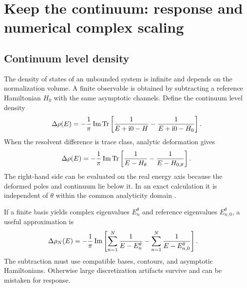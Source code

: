 \section{Keep the continuum: response and numerical complex scaling}
\label{sec:continuum-response}

\subsection{Continuum level density}
\label{subsec:cld}

The density of states of an unbounded system is infinite and depends on the
normalization volume.  A finite observable is obtained by subtracting a
reference Hamiltonian $H_0$ with the same asymptotic channels.  Define the
continuum level density
\begin{equation}
  \Delta\rho(E)
  =-\frac{1}{\pi}\operatorname{Im}\operatorname{Tr}\left[
  \frac{1}{E+\mathrm{i}0-H}
  -\frac{1}{E+\mathrm{i}0-H_0}
  \right] .
  \label{eq:cld-physical}
\end{equation}
When the resolvent difference is trace class, analytic deformation gives
\begin{equation}
  \Delta\rho(E)
  =-\frac{1}{\pi}\operatorname{Im}\operatorname{Tr}\left[
  \frac{1}{E-H_\theta}
  -\frac{1}{E-H_{0,\theta}}
  \right] .
  \label{eq:cld-csm}
\end{equation}
The right-hand side can be evaluated on the real energy axis because the
deformed poles and continuum lie below it.  In an exact calculation it is
independent of $\theta$ within the common analyticity domain
\cite{Myo:2014ypa,Morikawa:2025vvs,Ogawa:2026dSCSM}.

If a finite basis yields complex eigenvalues $E_n^{\theta}$ and reference
eigenvalues $E_{n,0}^{\theta}$, a useful approximation is
\begin{align}
  \Delta\rho_N(E)
  &=-\frac{1}{\pi}\operatorname{Im}
  \left[
  \sum_{n=1}^{N}\frac{1}{E-E_n^{\theta}}
  -\sum_{n=1}^{N}\frac{1}{E-E_{n,0}^{\theta}}
  \right] .
  \label{eq:finite-cld}
\end{align}
The subtraction must use compatible bases, contours, and asymptotic
Hamiltonians.  Otherwise large discretization artifacts survive and can be
mistaken for response.

